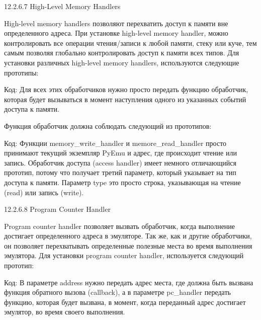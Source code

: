 \documentclass[12pt]{book}
\begin{document}
12.2.6.7 High-Level Memory Handlers

High-level memory handlers позволяют перехватить доступ к памяти вне определенного адреса. При установке high-level memory handler, можно контролировать все операции чтения/записи к любой памяти, стеку или куче, тем самым позволяя глобально контролировать доступ к памяти всех типов. Для установки различных high-level memory handlers, используются следующие прототипы:

Код:
Для всех этих обработчиков нужно просто передать функцию обработчик, которая будет вызываться в момент наступления одного из указанных событий доступа к памяти.

Функция обработчик должна соблюдать следующий из прототипов:

Код:
Функции memory\_write\_handler и memore\_read\_handler просто принимают текущий экземпляр PyEmu и адрес, где происходит чтение или запись. Обработчик доступа (access handler) имеет немного отличающийся прототип, потому что получает третий параметр, который указывает на тип доступа к памяти. Параметр type это просто строка, указывающая на чтение (read) или запись (write).

12.2.6.8 Program Counter Handler

Program counter handler позволяет вызвать обработчик, когда выполнение достигает определенного адреса в эмуляторе. Так же, как и другие обработчики, он позволяет перехватывать определенные полезные места во время выполнения эмулятора. Для установки program counter handler, используется следующий прототип:

Код:
В параметре address нужно передать адрес места, где должна быть вызвана функция обратного вызова (callback), а в параметре pc\_handler передать функцию, которая будет вызвана, в момент, когда переданный адрес достигает эмулятор, во время своего выполнения.
\end{document}
